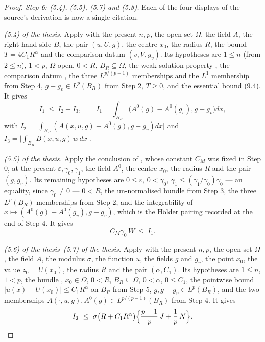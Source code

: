 \begin{proof}
\medskip
\noindent\emph{Step 6: \textup{(5.4)}, \textup{(5.5)}, \textup{(5.7)} and
\textup{(5.8)}.}  Each of the four displays of the source's derivation is now a
single citation.

\emph{(5.4) of the thesis.}  Apply  with the
present $n,p$, the open set $\Omega$, the field $A$, the right-hand side $B$,
the pair $(u,U,g)$, the centre $x_0$, the radius $R$, the bound
$T=4C_1R^{\alpha}$ and the comparison datum $(v,V,g_v)$.  Its hypotheses are
$1\le n$ (from $2\le n$), $1<p$, $\Omega$ open, $0<R$, $B_R\subseteq\Omega$, the
weak-solution property , the comparison datum
, the three $L^{p/(p-1)}$ memberships and the $L^1$
membership from Step 4, $g-g_v\in L^p(B_R)$ from Step 2, $T\ge0$, and the
essential bound (9.4).  It gives
\[
I_1\ \le\ I_2+I_3,
\qquad
I_1=\int_{B_R}\bigl(A^0(g)-A^0(g_v),g-g_v\bigr)dx,
\]
with $I_2=\bigl|\int_{B_R}(A(x,u,g)-A^0(g),g-g_v)dx\bigr|$ and
$I_3=\bigl|\int_{B_R}B(x,u,g)\,w\,dx\bigr|$.

\emph{(5.5) of the thesis.}  Apply the conclusion of
, whose constant $C_M$ was fixed in
Step 0, at the present $\varepsilon,\gamma_0,\gamma_1$, the field $A^0$, the
centre $x_0$, the radius $R$ and the pair $(g,g_v)$.  Its remaining hypotheses
are $0\le\varepsilon$, $0<\gamma_0$, $\gamma_1\le(\gamma_1/\gamma_0)\gamma_0$ ---
an equality, since $\gamma_0\ne0$ --- $0<R$, the un-normalised bundle from Step
3, the three $L^p(B_R)$ memberships from Step 2, and the integrability of
$x\mapsto(A^0(g)-A^0(g_v),g-g_v)$, which is the H\"older pairing recorded at the
end of Step 4.  It gives
\[
C_M\gamma_0\,W\ \le\ I_1 .
\]

\emph{(5.6) of the thesis--(5.7) of the thesis.}  Apply
 with the present $n,p$, the open set
$\Omega$, the field $A$, the modulus $\sigma$, the function $u$, the fields $g$
and $g_v$, the point $x_0$, the value $z_0=U(x_0)$, the radius $R$ and the pair
$(\alpha,C_1)$.  Its hypotheses are $1\le n$, $1<p$, the bundle
, $x_0\in\Omega$, $0<R$, $B_R\subseteq\Omega$,
$0<\alpha$, $0\le C_1$, the pointwise bound
$|u(x)-U(x_0)|\le C_1R^{\alpha}$ on $B_R$ from Step 5, $g,g-g_v\in L^p(B_R)$,
and the two memberships $A(\cdot,u,g),A^0(g)\in L^{p/(p-1)}(B_R)$ from Step 4.
It gives
\[
I_2\ \le\ \sigma\bigl(R+C_1R^{\alpha}\bigr)
\Bigl\{\frac{p-1}p\,J+\frac1p\,N\Bigr\}.
\]


\end{proof}
